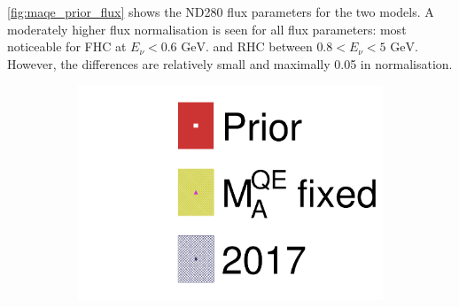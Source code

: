 \autoref{fig:maqe_prior_flux} shows the ND280 flux parameters for the two models. A moderately higher flux normalisation is seen for all flux parameters: most noticeable for FHC \numu at $E_\nu < 0.6\text{ GeV}$. and RHC \numubar between $0.8<E_\nu<5\text{ GeV}$. However, the differences are relatively small and maximally 0.05 in normalisation.
\begin{figure}[h]
	\begin{subfigure}[t]{0.1\textwidth}
		\includegraphics[width=\textwidth, trim={0mm 0mm 0mm 0mm}, clip,page=1]{figures/mach3/data/alt/2017b_MAQEBC_Data_merg_2017b_NewData_NewDet_UpdXsecStep_2Xsec_4Det_5Flux_0.pdf}
	\end{subfigure}
	

\end{figure}
